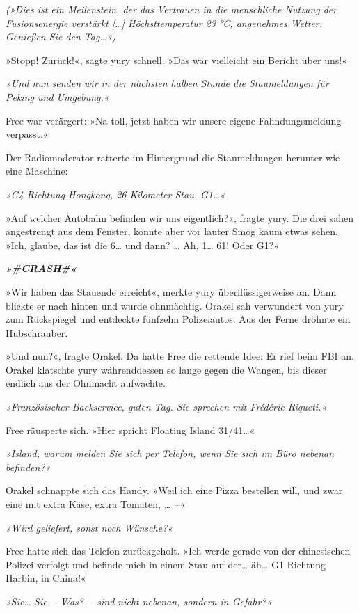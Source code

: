 \textit{(»Dies ist ein Meilenstein, der das Vertrauen in die menschliche Nutzung der Fusionsenergie verstärkt […] Höchsttemperatur 23 °C, angenehmes Wetter. Genießen Sie den Tag…«)}

»Stopp! Zurück!«, sagte yury schnell. »Das war vielleicht ein Bericht über uns!«

\textit{»Und nun senden wir in der nächsten halben Stunde die Staumeldungen für Peking und Umgebung.«}

Free war verärgert: »Na toll, jetzt haben wir unsere eigene Fahndungsmeldung verpasst.«

Der Radiomoderator ratterte im Hintergrund die Staumeldungen herunter wie eine Maschine:

\textit{»G4 Richtung Hongkong, 26 Kilometer Stau. G1…«}

»Auf welcher Autobahn befinden wir uns eigentlich?«, fragte yury. Die drei sahen angestrengt aus dem Fenster, konnte aber vor lauter Smog kaum etwas sehen. »Ich, glaube, das ist die 6… und dann? … Ah, 1… 61! Oder G1?«

\textbf{\textit{»\#CRASH\#«}}

»Wir haben das Stauende erreicht«, merkte yury überflüssigerweise an. Dann blickte er nach hinten und wurde ohnmächtig. Orakel sah verwundert von yury zum Rückspiegel und entdeckte fünfzehn Polizeiautos. Aus der Ferne dröhnte ein Hubschrauber.

»Und nun?«, fragte Orakel. Da hatte Free die rettende Idee: Er rief beim FBI an. Orakel klatschte yury währenddessen so lange gegen die Wangen, bis dieser endlich aus der Ohnmacht aufwachte.

\textit{»Französischer Backservice, guten Tag. Sie sprechen mit Frédéric Riqueti.«}

Free räusperte sich. »Hier spricht Floating Island 31/41…«

\textit{»Island, warum melden Sie sich per Telefon, wenn Sie sich im Büro nebenan befinden?«}

Orakel schnappte sich das Handy. »Weil ich eine Pizza bestellen will, und zwar eine mit extra Käse, extra Tomaten, …~–«

\textit{»Wird geliefert, sonst noch Wünsche?«}

Free hatte sich das Telefon zurückgeholt. »Ich werde gerade von der chinesischen Polizei verfolgt und befinde mich in einem Stau auf der… äh… G1 Richtung Harbin, in China!«

\textit{»Sie… Sie~– Was?~– sind nicht nebenan, sondern in Gefahr?«}

